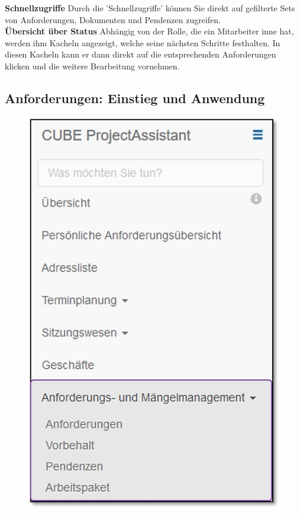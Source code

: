 \textbf{Schnellzugriffe}
Durch die 'Schnellzugriffe' können Sie direkt auf gefilterte Sets von Anforderungen, Dokumenten und Pendenzen zugreifen. \\

\textbf{Übersicht über Status}
Abhängig von der Rolle, die ein Mitarbeiter inne hat, werden ihm Kacheln angezeigt, welche seine nächsten Schritte festhalten. In diesen Kacheln kann er dann direkt auf die entsprechenden Anforderungen klicken und die weitere Bearbeitung vornehmen.

\pagebreak

\subsection{Anforderungen: Einstieg und Anwendung}

\begin{figure}   %
  \vspace{-30pt}      %
  \begin{center}
    \includegraphics[width=1\linewidth]{../chapters/06_Anf-Maengelmanagement/pictures/amm_Menue.jpg}

\end{center}
\end{figure}
